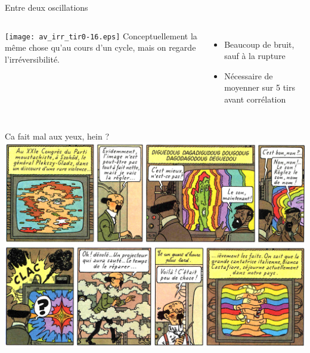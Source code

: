 \documentclass{beamer}
\begin{document}
\begin{frame}{Entre deux oscillations}
\begin{columns}
\texttt{[image: av\_irr\_tir0-16.eps]}
Conceptuellement la même chose qu'au cours d'un cycle, mais on regarde l'irréversibilité.
\begin{itemize}
\item Beaucoup de bruit, sauf à la rupture
\item Nécessaire de moyenner sur 5 tirs avant corrélation
\end{itemize}
\end{columns}


\end{frame}

\begin{frame}{Ca fait mal aux yeux, hein ?}
\includegraphics[width=\columnwidth]{TV_tournesol.jpg}
\end{frame}
\end{document}
